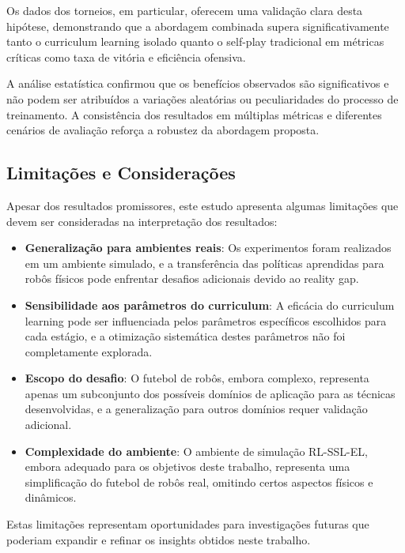 Os dados dos torneios, em particular, oferecem uma validação clara desta hipótese, demonstrando que a abordagem combinada supera significativamente tanto o curriculum learning isolado quanto o self-play tradicional em métricas críticas como taxa de vitória e eficiência ofensiva.

A análise estatística confirmou que os benefícios observados são significativos e não podem ser atribuídos a variações aleatórias ou peculiaridades do processo de treinamento. A consistência dos resultados em múltiplas métricas e diferentes cenários de avaliação reforça a robustez da abordagem proposta.

\subsection{Limitações e Considerações}

Apesar dos resultados promissores, este estudo apresenta algumas limitações que devem ser consideradas na interpretação dos resultados:

\begin{itemize}
    \item \textbf{Generalização para ambientes reais}: Os experimentos foram realizados em um ambiente simulado, e a transferência das políticas aprendidas para robôs físicos pode enfrentar desafios adicionais devido ao reality gap.
    
    \item \textbf{Sensibilidade aos parâmetros do curriculum}: A eficácia do curriculum learning pode ser influenciada pelos parâmetros específicos escolhidos para cada estágio, e a otimização sistemática destes parâmetros não foi completamente explorada.
    
    \item \textbf{Escopo do desafio}: O futebol de robôs, embora complexo, representa apenas um subconjunto dos possíveis domínios de aplicação para as técnicas desenvolvidas, e a generalização para outros domínios requer validação adicional.
    
    \item \textbf{Complexidade do ambiente}: O ambiente de simulação RL-SSL-EL, embora adequado para os objetivos deste trabalho, representa uma simplificação do futebol de robôs real, omitindo certos aspectos físicos e dinâmicos.
\end{itemize}

Estas limitações representam oportunidades para investigações futuras que poderiam expandir e refinar os insights obtidos neste trabalho.

